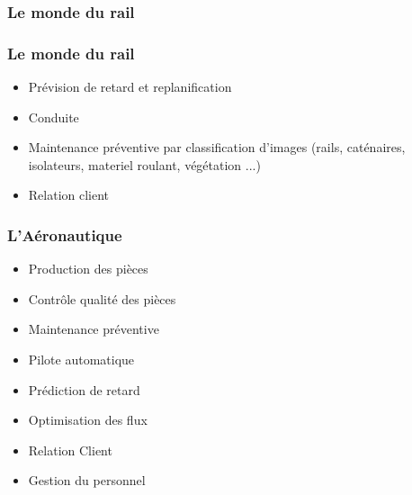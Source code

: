 \begin{frame}
  \frametitle{Le monde du rail}
\end{frame}

\begin{frame}
  \frametitle{Le monde du rail}
  \begin{itemize}
  \item Prévision de retard et replanification
  \item Conduite
  \item Maintenance préventive par classification d'images (rails, caténaires, isolateurs, materiel roulant, végétation ...)
  \item Relation client
  \end{itemize}
\end{frame}

\begin{frame}
  \frametitle{L'Aéronautique}
  \begin{minipage}[c]{0.49\linewidth}
    \begin{itemize}
    \item Production des pièces
    \item Contrôle qualité des pièces
    \item Maintenance préventive
    \item Pilote automatique
    \item Prédiction de retard
    \item Optimisation des flux
    \item Relation Client
    \item Gestion du personnel
    \end{itemize}
  \end{minipage}\hfill
  \begin{minipage}[c]{0.49\linewidth}
  \end{minipage}\hfill
\end{frame}

